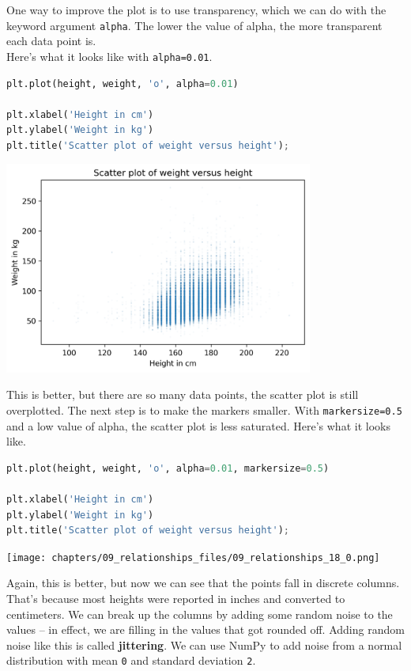 One way to improve the plot is to use transparency, which we can do with
the keyword argument \passthrough{\lstinline!alpha!}. The lower the
value of alpha, the more transparent each data point is.\\
Here's what it looks like with \passthrough{\lstinline!alpha=0.01!}.

\begin{lstlisting}[language=Python,style=source]
plt.plot(height, weight, 'o', alpha=0.01)

plt.xlabel('Height in cm')
plt.ylabel('Weight in kg')
plt.title('Scatter plot of weight versus height');
\end{lstlisting}

\begin{center}
\includegraphics[width=4in]{chapters/09_relationships_files/09_relationships_16_0.png}
\end{center}

This is better, but there are so many data points, the scatter plot is
still overplotted. The next step is to make the markers smaller. With
\passthrough{\lstinline!markersize=0.5!} and a low value of alpha, the
scatter plot is less saturated. Here's what it looks like.

\begin{lstlisting}[language=Python,style=source]
plt.plot(height, weight, 'o', alpha=0.01, markersize=0.5)

plt.xlabel('Height in cm')
plt.ylabel('Weight in kg')
plt.title('Scatter plot of weight versus height');
\end{lstlisting}

\begin{center}
\texttt{[image: chapters/09\_relationships\_files/09\_relationships\_18\_0.png]}
\end{center}

Again, this is better, but now we can see that the points fall in
discrete columns. That's because most heights were reported in inches
and converted to centimeters. We can break up the columns by adding some
random noise to the values -- in effect, we are filling in the values
that got rounded off. Adding random noise like this is called
\textbf{jittering}. We can use NumPy to add noise from a normal
distribution with mean \passthrough{\lstinline!0!} and standard
deviation \passthrough{\lstinline!2!}.

